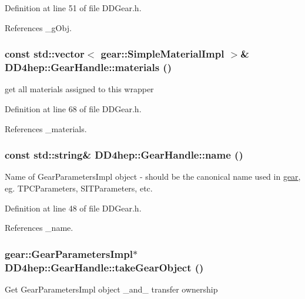 Definition at line 51 of file DDGear.h.

References \_\-gObj.\hypertarget{class_d_d4hep_1_1_gear_handle_ae127a028091e597d755f33c1d1303032}{
\subsubsection[{materials}]{\setlength{\rightskip}{0pt plus 5cm}const std::vector$<$ gear::SimpleMaterialImpl $>$\& DD4hep::GearHandle::materials ()}}
\label{class_d_d4hep_1_1_gear_handle_ae127a028091e597d755f33c1d1303032}


get all materials assigned to this wrapper 

Definition at line 68 of file DDGear.h.

References \_\-materials.\hypertarget{class_d_d4hep_1_1_gear_handle_acb3a333f73bd074c0d91bc453ae85cc0}{
\subsubsection[{name}]{\setlength{\rightskip}{0pt plus 5cm}const std::string\& DD4hep::GearHandle::name ()}}
\label{class_d_d4hep_1_1_gear_handle_acb3a333f73bd074c0d91bc453ae85cc0}
Name of GearParametersImpl object -\/ should be the canonical name used in \hyperlink{namespacegear}{gear}, eg. TPCParameters, SITParameters, etc. 

Definition at line 48 of file DDGear.h.

References \_\-name.\hypertarget{class_d_d4hep_1_1_gear_handle_a6dc3d8b5eaadccd2a6fa8c8e31739cbd}{
\subsubsection[{takeGearObject}]{\setlength{\rightskip}{0pt plus 5cm}gear::GearParametersImpl$\ast$ DD4hep::GearHandle::takeGearObject ()}}
\label{class_d_d4hep_1_1_gear_handle_a6dc3d8b5eaadccd2a6fa8c8e31739cbd}
Get GearParametersImpl object \_\-and\_\- transfer ownership 

